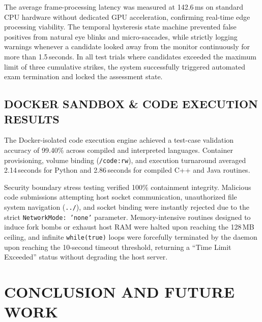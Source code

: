 \documentclass[12pt,a4paper]{report}
\begin{document}
The average frame-processing latency was measured at 142.6\,ms on standard CPU hardware
without dedicated GPU acceleration, confirming real-time edge processing viability. The
temporal hysteresis state machine prevented false positives from natural eye blinks and
micro-saccades, while strictly logging warnings whenever a candidate looked away from
the monitor continuously for more than 1.5\,seconds. In all test trials where candidates
exceeded the maximum limit of three cumulative strikes, the system successfully triggered
automated exam termination and locked the assessment state.

\section{DOCKER SANDBOX \& CODE EXECUTION RESULTS}

The Docker-isolated code execution engine achieved a test-case validation accuracy of
99.40\% across compiled and interpreted languages. Container provisioning, volume binding
(\texttt{/code:rw}), and execution turnaround averaged 2.14\,seconds for Python and
2.86\,seconds for compiled C++ and Java routines.

Security boundary stress testing verified 100\% containment integrity. Malicious code
submissions attempting host socket communication, unauthorized file system navigation
(\texttt{../}), and socket binding were instantly rejected due to the strict
\texttt{NetworkMode: 'none'} parameter. Memory-intensive routines designed to induce
fork bombs or exhaust host RAM were halted upon reaching the 128\,MB ceiling, and
infinite \texttt{while(true)} loops were forcefully terminated by the daemon upon reaching
the 10-second timeout threshold, returning a ``Time Limit Exceeded'' status without
degrading the host server.

\chapter{CONCLUSION AND FUTURE WORK}
\end{document}
